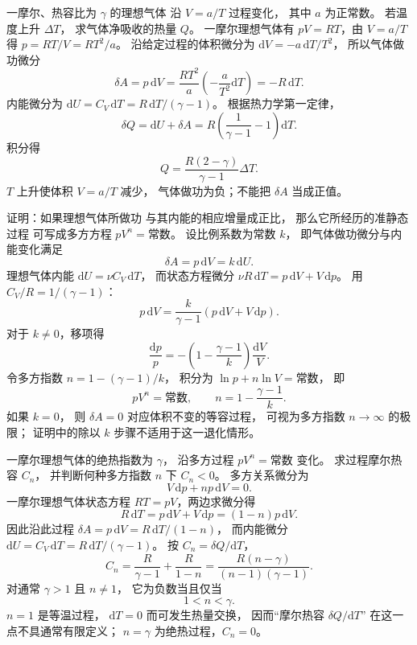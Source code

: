 一摩尔、热容比为 $\gamma$ 的理想气体
沿 $V=a/T$ 过程变化，
其中 $a$ 为正常数。
若温度上升 $\Delta T$，
求气体净吸收的热量 $Q$。
\exsolution
一摩尔理想气体有
$pV=RT$，由
$V=a/T$ 得
$p=RT/V=RT^2/a$。
沿给定过程的体积微分为
$\mathrm dV=-a\,\mathrm dT/T^2$，
所以气体做功微分
\[
\delta A=p\,\mathrm dV
=\frac{RT^2}{a}
\left(-\frac a{T^2}\mathrm dT\right)
=-R\,\mathrm dT.
\]
内能微分为
$\mathrm dU=C_V\,\mathrm dT
=R\,\mathrm dT/(\gamma-1)$。
根据热力学第一定律，
\[
\delta Q=\mathrm dU+\delta A
=R\left(\frac1{\gamma-1}-1\right)\mathrm dT.
\]
积分得
\[
\boxed{Q=\frac{R(2-\gamma)}{\gamma-1}\Delta T}.
\]
\excheck $T$ 上升使体积 $V=a/T$ 减少，
气体做功为负；不能把 $\delta A$ 当成正值。

证明：如果理想气体所做功
与其内能的相应增量成正比，
那么它所经历的准静态过程
可写成多方方程
$pV^n=\text{常数}$。
\exsolution
设比例系数为常数 $k$，
即气体做功微分与内能变化满足
\[
\delta A=p\,\mathrm dV=k\,\mathrm dU.
\]
理想气体内能
$\mathrm dU=\nu C_V\,\mathrm dT$，
而状态方程微分
$\nu R\,\mathrm dT=p\,\mathrm dV+V\,\mathrm dp$。
用
$C_V/R=1/(\gamma-1)$：
\[
p\,\mathrm dV
=\frac{k}{\gamma-1}
(p\,\mathrm dV+V\,\mathrm dp).
\]
对于 $k\ne0$，移项得
\[
\frac{\mathrm dp}{p}
=-\left(1-\frac{\gamma-1}{k}\right)
\frac{\mathrm dV}{V}.
\]
令多方指数
$n=1-(\gamma-1)/k$，
积分为
$\ln p+n\ln V=\text{常数}$，
即
\[
\boxed{pV^n=\text{常数},\qquad
n=1-\frac{\gamma-1}{k}}.
\]
\excheck 如果 $k=0$，
则 $\delta A=0$ 对应体积不变的等容过程，
可视为多方指数 $n\to\infty$ 的极限；
证明中的除以 $k$ 步骤不适用于这一退化情形。

一摩尔理想气体的绝热指数为 $\gamma$，
沿多方过程 $pV^n=\text{常数}$
变化。
求过程摩尔热容 $C_n$，
并判断何种多方指数 $n$ 下 $C_n<0$。
\exsolution
多方关系微分为
\[
V\,\mathrm dp+n p\,\mathrm dV=0.
\]
一摩尔理想气体状态方程
$RT=pV$，两边求微分得
\[
R\,\mathrm dT=p\,\mathrm dV+V\,\mathrm dp
=(1-n)p\,\mathrm dV.
\]
因此沿此过程
$\delta A=p\,\mathrm dV=
R\,\mathrm dT/(1-n)$，
而内能微分
$\mathrm dU=C_V\,\mathrm dT
=R\,\mathrm dT/(\gamma-1)$。
按 $C_n=\delta Q/\mathrm dT$，
\[
C_n=
\frac{R}{\gamma-1}+\frac{R}{1-n}
=\boxed{\frac{R(n-\gamma)}
{(n-1)(\gamma-1)}}.
\]
对通常 $\gamma>1$ 且 $n\ne1$，
它为负数当且仅当
\[
\boxed{1<n<\gamma}.
\]
\excheck $n=1$ 是等温过程，
$\mathrm dT=0$ 而可发生热量交换，
因而“摩尔热容 $\delta Q/\mathrm dT$”
在这一点不具通常有限定义；
$n=\gamma$ 为绝热过程，$C_n=0$。
